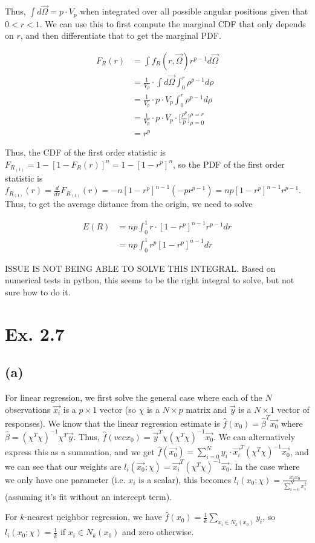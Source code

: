 \documentclass[]{article}
\begin{document}
Thus, $\int d\vec{\Omega} = p \cdot V_p$ when integrated over all possible angular positions given that $0<r<1$. We can use this to first compute the marginal CDF that only depends on $r$, and then differentiate that to get the marginal PDF.


\begin{equation}
	\begin{aligned}
		F_R(r) &= \int f_R(r, \vec{\Omega}) r^{p-1} d\vec{\Omega} \\
		&=\frac{1}{V_p} \cdot \int d\vec{\Omega} \int_0^r \rho^{p-1} d\rho \\
		&= \frac{1}{V_p} \cdot p\cdot V_p \int_0^r \rho^{p-1} d\rho \\
		&= \frac{1}{V_p} \cdot p \cdot V_p \cdot \bigg[\frac{\rho^p}{p} \bigg]_{\rho=0}^{\rho=r} \\
		&= r^p
 	\end{aligned}
\end{equation}


Thus, the CDF of the first order statistic is $F_{R_{(1)}} = 1 - [1 - F_R(r)]^n = 1 - [1 - r^p]^n$, so the PDF of the first order statistic is $f_{R_{(1)}}(r) = \frac{d}{dr} F_{R_{(1)}}(r) = -n[1-r^p]^{n-1}(-pr^{p-1})=np[1-r^p]^{n-1}r^{p-1}$. Thus, to get the average distance from the origin, we need to solve

\begin{equation}
	\begin{aligned}
		E(R) &= np\int_0^1 r\cdot [1-r^p]^{n-1}r^{p-1}dr \\
		&= np\int_0^1 r^p [1-r^p]^{n-1}dr
	\end{aligned}
\end{equation}

ISSUE IS NOT BEING ABLE TO SOLVE THIS INTEGRAL. Based on numerical tests in python, this seems to be the right integral to solve, but not sure how to do it.


\section{Ex. 2.7}

\subsection{(a)}

For linear regression, we first solve the general case where each of the $N$ observations $\vec{x_i}$ is a $p\times 1$ vector (so $\chi$ is a $N\times p$ matrix and $\vec{y}$ is a $N \times 1$ vector of responses). We know that the linear regression estimate is $\hat{f}(x_0) = \hat{\beta}^T \vec{x_0}$ where $\hat{\beta} = (\chi^T \chi)^{-1} \chi^T \vec{y}$. Thus, $\hat{f}(vec{x_0}) = \vec{y}^T \chi(\chi^T \chi)^{-1} \vec{x_0}$. We can alternatively express this as a summation, and we get $\hat{f}(\vec{x_0}) = \sum_{i=0}^N y_i \cdot \vec{x_i}^T (\chi^T \chi)^{-1} \vec{x_0}$, and we can see that our weights are $l_i(\vec{x_0}; \chi) = \vec{x_i}^T(\chi^T \chi)^{-1} \vec{x_0}$. In the case where we only have one parameter (i.e. $x_i$ is a scalar), this becomes $l_i(x_0; \chi) = \frac{x_i x_0}{\sum_{i=0}^N x_i^2}$ (assuming it's fit without an intercept term).


For $k$-nearest neighbor regression, we have $\hat{f}(x_0) = \frac{1}{k} \sum_{x_i \in N_k(x_0)} y_i$, so $l_i(x_0; \chi) = \frac{1}{k}$ if $x_i \in N_k(x_0)$ and zero otherwise.
\end{document}
